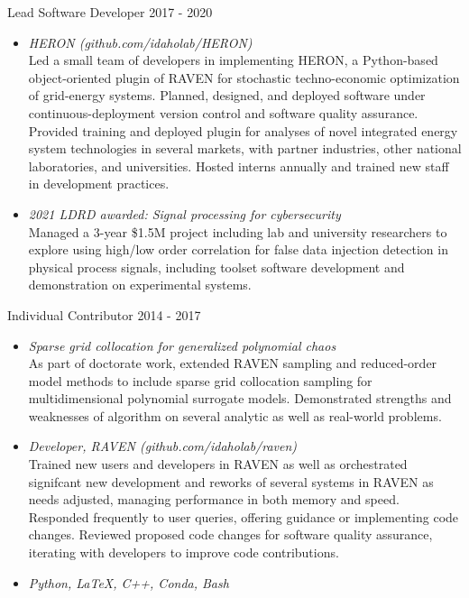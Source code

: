 \documentclass{res}
\begin{document}
\begin{resume}
Lead Software Developer \hfill    2017 - 2020
\begin{itemize} \itemsep -2pt
  \item \emph{HERON (github.com/idaholab/HERON)} \\
  Led a small team of developers in implementing HERON, a Python-based object-oriented plugin of RAVEN
  for stochastic techno-economic optimization of grid-energy systems. Planned, designed, and deployed
  software under continuous-deployment version control and software quality assurance. Provided training
  and deployed plugin for analyses of novel integrated energy system technologies in several markets,
   with partner industries, other national laboratories, and universities. Hosted interns annually
   and trained new staff in development practices.
  \item \emph{2021 LDRD awarded: Signal processing for cybersecurity} \\
  Managed a 3-year \$1.5M project including lab and university researchers to explore using high/low
  order correlation for false data injection detection in physical process signals, including
  toolset software development and demonstration on experimental systems.
\end{itemize} \vspace{-6pt}

Individual Contributor \hfill    2014 - 2017
\begin{itemize} \itemsep -2pt
  \item \emph{Sparse grid collocation for generalized polynomial chaos} \\
  As part of doctorate work, extended RAVEN sampling and reduced-order model methods to include
  sparse grid collocation sampling for multidimensional polynomial surrogate models. Demonstrated
  strengths and weaknesses of algorithm on several analytic as well as real-world problems.
  \item \emph{Developer, RAVEN (github.com/idaholab/raven)} \\
  Trained new users and developers in RAVEN as well as orchestrated signifcant new development and reworks
  of several systems in RAVEN as needs adjusted, managing performance in both memory and speed.
  Responded frequently to user queries, offering guidance or implementing code changes. Reviewed
  proposed code changes for software quality assurance, iterating with developers to improve code
  contributions.
  \item \emph{Python, LaTeX, C++, Conda, Bash}
\end{itemize} \vspace{-6pt}


\end{resume}
\end{document}
